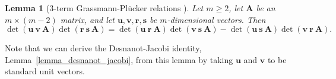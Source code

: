 \documentclass[a4paper, 11pt]{article}
\newcommand{\Z}{\mathbb{Z}}
\newcommand{\bA}{\bm{A}}
\newcommand{\br}{\bm{r}}
\newcommand{\bs}{\bm{s}}
\newcommand{\bv}{\bm{v}}
\newcommand{\bu}{\bm{u}}
\newcommand{\bM}{\bm{M}}
\newcommand{\indet}{x}
\newcommand{\intvar}{a}
\newcommand{\intvarfixed}{a}
\newcommand{\polyring}{\Z[\indet]}
\newcommand{\polyS}{S}
\newcommand{\polyM}{\bM}
\newtheorem{lemma}{Lemma}
\begin{document}
\begin{lemma}[{3-term Grassmann-Pl\"ucker relations \cite[Ch. 3]{BLSWZ1999}}] \label{lemma_3_term_GP_relations}
Let $m\geq 2$, let $\bA$ be an $m\times (m-2)$ matrix, and let $\bu,\bv,\br,\bs$ be $m$-dimensional vectors. Then 
\[
\det(\bu\ \bv\ \bA)\det(\br\ \bs\ \bA)=\det(\bu\ \br\ \bA)\det(\bv\ \bs\ \bA)-\det(\bu\ \bs\ \bA)\det(\bv\ \br\ \bA).
\]
\end{lemma}
Note that we can derive the Desnanot-Jacobi identity, Lemma~\ref{lemma_desnanot_jacobi}, from this lemma by taking $\bu$ and $\bv$ to be standard unit vectors.
%	
\end{document}
